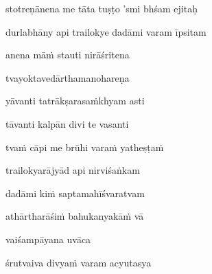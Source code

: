 stotreṇānena me tāta tuṣṭo 'smi bhśam ejitaḥ\thinspace{\dandab} \dontdisplaylinenum

durlabhāny api trailokye dadāmi varam īpsitam \veg\dontdisplaylinenum
{}

\ujvers\nemsloka 
anena māṁ stauti nirāśritena
\dontdisplaylinenum

\nemslokab 
tvayoktavedārthamanohareṇa \danda\dontdisplaylinenum

\nemslokac 
yāvanti tatrākṣarasaṁkhyam asti
\dontdisplaylinenum

\nemslokad 
tāvanti kalpān divi te vasanti \veg\dontdisplaylinenum
{}

\ujvers\nemsloka 
tvaṁ cāpi me brūhi varaṁ yatheṣṭaṁ
\dontdisplaylinenum

\nemslokab 
trailokyarājyād api nirviśaṅkam \danda\dontdisplaylinenum

\nemslokac 
dadāmi kiṁ saptamahīśvaratvam
\dontdisplaylinenum

\nemslokad 
athārtharāśiṁ bahukanyakāṁ vā \veg\dontdisplaylinenum

\vers
{}

vaiśampāyana uvāca~{\dandab}\dontdisplaylinenum 
{}

\nemsloka 
śrutvaiva divyaṁ varam acyutasya
\dontdisplaylinenum

